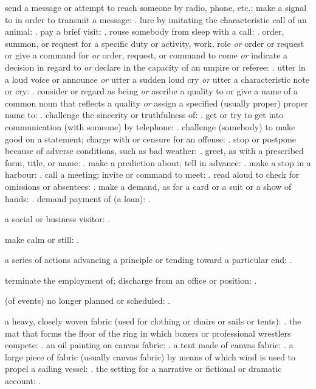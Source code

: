   send a message or attempt to reach someone by radio, phone, etc.; make a signal to in order to transmit a message: . lure by imitating the characteristic call of an animal: . pay a brief visit: . rouse somebody from sleep with a call: . order, summon, or request for a specific duty or activity, work, role \textit{or} order or request or give a command for \textit{or} order, request, or command to come \textit{or} indicate a decision in regard to \textit{or} declare in the capacity of an umpire or referee: . utter in a loud voice or announce \textit{or} utter a sudden loud cry \textit{or} utter a characteristic note or cry: . consider or regard as being \textit{or} ascribe a quality to or give a name of a common noun that reflects a quality \textit{or} assign a specified (usually proper) proper name to: . challenge the sincerity or truthfulness of: . get or try to get into communication (with someone) by telephone: . challenge (somebody) to make good on a statement; charge with or censure for an offense: . stop or postpone because of adverse conditions, such as bad weather: . greet, as with a prescribed form, title, or name: . make a prediction about; tell in advance: . make a stop in a harbour: . call a meeting; invite or command to meet: . read aloud to check for omissions or absentees: . make a demand, as for a card or a suit or a show of hands: . demand payment of (a loan): .

  a social or business visitor: .

  make calm or still: .

  a series of actions advancing a principle or tending toward a particular end: .

  terminate the employment of; discharge from an office or position: .

  (of events) no longer planned or scheduled: .

  a heavy, closely woven fabric (used for clothing or chairs or sails or tents): . the mat that forms the floor of the ring in which boxers or professional wrestlers compete: . an oil painting on canvas fabric: . a tent made of canvas fabric: . a large piece of fabric (usually canvas fabric) by means of which wind is used to propel a sailing vessel: . the setting for a narrative or fictional or dramatic account: .

